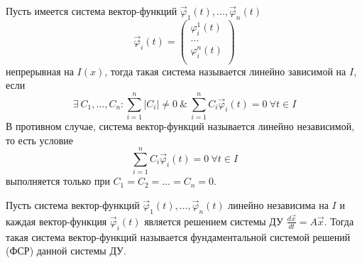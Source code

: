 \begin{definition}
    Пусть имеется система вектор-функций $\overrightarrow \varphi_1(t), \dots, \overrightarrow \varphi_n(t)$
    \begin{equation}
        \overrightarrow \varphi_i(t) =
        \begin{pmatrix}
            \varphi_i^1(t) \\
            \dots \\
            \varphi_i^n(t) \\
        \end{pmatrix}           
    \end{equation}
    непрерывная на $I(x)$, тогда такая система называется
    линейно зависимой на $I$, если \[\exists ~ C_1, \dots, C_n : \sum^n_{i = 1} |C_i| \neq 0 ~ \& ~ \sum^n_{i = 1} C_i \overrightarrow \varphi_i(t) = 0 ~ \forall t \in I\]
    В противном случае, система вектор-функций называется линейно независимой, то есть условие
    \[\sum^n_{i = 1} C_i \overrightarrow \varphi_i(t) = 0 ~ \forall t \in I\] выполняется только при $C_1 = C_2 = \dots = C_n = 0$.
\end{definition}

\begin{definition}
    Пусть система вектор-функций $\overrightarrow \varphi_1(t), \dots, \overrightarrow \varphi_n(t)$ линейно независима на $I$ и каждая вектор-функция
    $\overrightarrow \varphi_i(t)$ является решением системы ДУ $\frac{d \overrightarrow x}{dt} = A \overrightarrow x$. Тогда такая система вектор-функций
    называется фундаментальной системой решений (ФСР) данной системы ДУ.
\end{definition}

